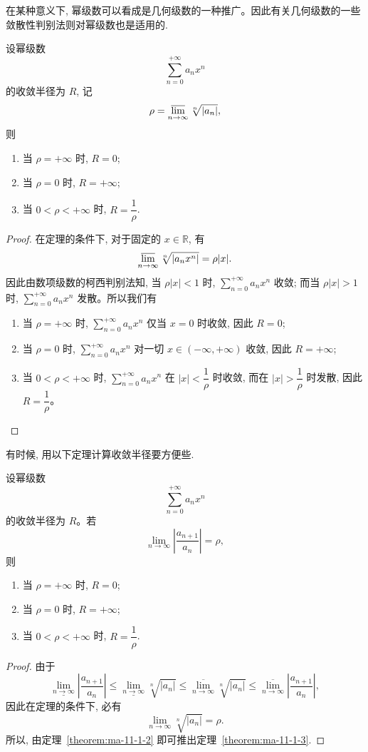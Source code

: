 在某种意义下, 幂级数可以看成是几何级数的一种推广。因此有关几何级数的一些敛散性判别法则对幂级数也是适用的.

\begin{theorem}[{柯西--哈达玛定理}]\label{theorem:ma-11-1-2}
设幂级数
\[
  \sum_{n=0}^{+\infty}a_nx^n
\]
的收敛半径为 $R$, 记
\[
  \rho=\varlimsup_{n\to\infty}\sqrt[n]{|a_n|},
\]
则
\begin{enumerate}
  \item 当 $\rho=+\infty$ 时, $R=0$;
  \item 当 $\rho=0$ 时, $R=+\infty$;
  \item 当 $0<\rho<+\infty$ 时, $R=\dfrac1\rho$.
\end{enumerate}
\end{theorem}


\begin{proof}
在定理的条件下, 对于固定的 $x\in\mathbb R$, 有
\[
  \varlimsup_{n\to\infty}\sqrt[n]{|a_nx^n|}
  =
  \rho|x|.
\]
因此由数项级数的柯西判别法知, 当 $\rho|x|<1$ 时, $\sum_{n=0}^{+\infty}a_nx^n$ 收敛; 而当 $\rho|x|>1$ 时, $\sum_{n=0}^{+\infty}a_nx^n$ 发散。所以我们有
\begin{enumerate}
  \item 当 $\rho=+\infty$ 时, $\sum_{n=0}^{+\infty}a_nx^n$ 仅当 $x=0$ 时收敛, 因此 $R=0$;
  \item 当 $\rho=0$ 时, $\sum_{n=0}^{+\infty}a_nx^n$ 对一切 $x\in(-\infty,+\infty)$ 收敛, 因此 $R=+\infty$;
  \item 当 $0<\rho<+\infty$ 时, $\sum_{n=0}^{+\infty}a_nx^n$ 在 $|x|<\dfrac1\rho$ 时收敛, 而在 $|x|>\dfrac1\rho$ 时发散, 因此 $R=\dfrac1\rho$。
\end{enumerate}
\end{proof}


有时候, 用以下定理计算收敛半径要方便些.

\begin{theorem}\label{theorem:ma-11-1-3}
设幂级数
\[
  \sum_{n=0}^{+\infty}a_nx^n
\]
的收敛半径为 $R$。若
\[
  \lim_{n\to\infty}\left|\frac{a_{n+1}}{a_n}\right|=\rho,
\]
则
\begin{enumerate}
  \item 当 $\rho=+\infty$ 时, $R=0$;
  \item 当 $\rho=0$ 时, $R=+\infty$;
  \item 当 $0<\rho<+\infty$ 时, $R=\dfrac1\rho$.
\end{enumerate}
\end{theorem}


\begin{proof}
由于
\[
  \underline{\lim_{n\to\infty}}\left|\frac{a_{n+1}}{a_n}\right|
  \leqslant
  \underline{\lim_{n\to\infty}}\sqrt[n]{|a_n|}
  \leqslant
  \overline{\lim_{n\to\infty}}\sqrt[n]{|a_n|}
  \leqslant
  \overline{\lim_{n\to\infty}}\left|\frac{a_{n+1}}{a_n}\right|,
\]
因此在定理的条件下, 必有
\[
  \lim_{n\to\infty}\sqrt[n]{|a_n|}=\rho.
\]
所以, 由定理~\ref{theorem:ma-11-1-2} 即可推出定理~\ref{theorem:ma-11-1-3}.
\end{proof}


